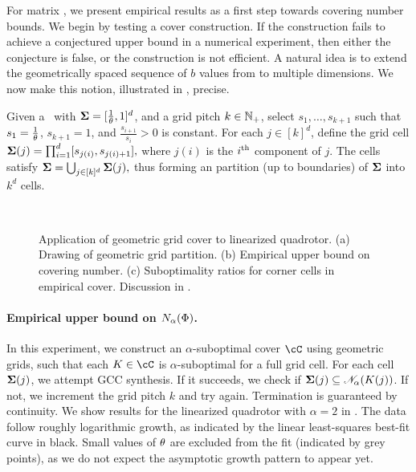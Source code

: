 \label{sec:grid}

For matrix \DDFproblems,
we present empirical results as a first step towards covering number bounds. %
We begin by testing a cover construction. %
If the construction fails to achieve a conjectured upper bound in a numerical experiment,
then either the conjecture is false,
or the construction is not efficient.
A natural idea is to extend
the geometrically spaced sequence of $b$ values from
to multiple dimensions.
We now make this notion, illustrated in , precise.

\begin{definition}
\label{def:geomgrid}
	Given a \DDFproblem\ with $\boldsymbol\Sigma = [\frac{1}{\theta}, 1]^d$,
	and a grid pitch $k \in \mathbb{N}_+$,
	select
	$s_1, \dots, s_{k+1}$
	such that
	$s_1 = \frac{1}{\theta}$,
	$s_{k + 1} = 1$,
	and $\frac{s_{i+1}}{s_i} > 0$
	is constant.
	For each $j \in [k]^d$, define the grid cell
	\(
		\boldsymbol\Sigma(j) = \textstyle \prod_{i=1}^d [s_{j(i)}, s_{j(i) + 1}],
	\)
	where $j(i)$ is the $i^{\mathrm{th}}$ component of $j$.
	The cells satisfy
	\(
		\boldsymbol\Sigma = \textstyle \bigcup_{j \in [k]^d} \boldsymbol\Sigma(j),
	\)
	thus forming an partition (up to boundaries) of $\boldsymbol\Sigma$ into $k^d$ cells.
\end{definition}

\begin{figure}%
	~\hfill
	~\hfill
	\caption{%
		Application of geometric grid cover to linearized quadrotor.
		(a) Drawing of geometric grid partition.
		(b) Empirical upper bound on covering number. %
		(c) Suboptimality ratios for corner cells in empirical cover.
		Discussion in .
	}
\end{figure}

\paragraph{Empirical upper bound on $N_{\alpha}(\Phi)$.}
In this experiment, we construct an $\alpha$-suboptimal cover
$\coveringset$
using geometric grids,
such that each $K \in \coveringset$
is $\alpha$-suboptimal for a full grid cell.
For each cell $\boldsymbol\Sigma(j)$, we attempt GCC synthesis.
If it succeeds,
we check if $\boldsymbol\Sigma(j) \subseteq \mathscr{N}_{\alpha}(K(j))$.
If not, we increment the grid pitch $k$ and try again.
Termination is guaranteed by continuity.
We show results for %
the linearized quadrotor %
with $\alpha = 2$ in
.
The data follow roughly logarithmic growth,
as indicated by the linear least-squares best-fit curve in black.
Small values of $\theta$ are excluded from the fit (indicated by grey points),
as we do not expect the asymptotic growth pattern to appear yet.

